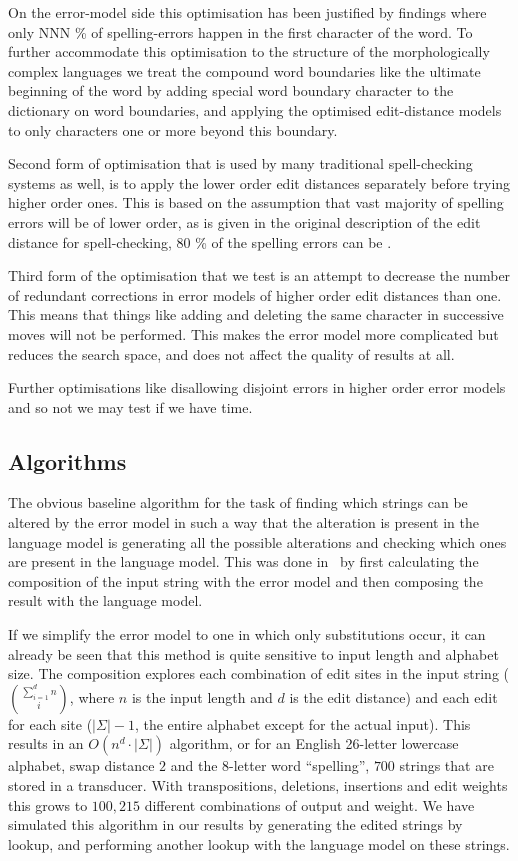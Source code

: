 \documentclass[11pt]{article}
\begin{document}
On the error-model side this optimisation has been
justified by findings where only NNN \% of spelling-errors happen in the first
character of the word\cite{Yannakoudakis/1983}. To further accommodate this
optimisation to the structure of the morphologically complex languages we treat
the compound word boundaries like the ultimate beginning of the word by adding
special word boundary character to the dictionary on word boundaries, and
applying the optimised edit-distance models to only characters one or more
beyond this boundary.

Second form of optimisation that is used by many traditional spell-checking
systems as well, is to apply the lower order edit distances separately before
trying higher order ones. This is based on the assumption that vast majority
of spelling errors will be of lower order, as is given in the original
description of the edit distance for spell-checking, 80 \% of the spelling
errors can be \cite{Pollock/1984}.

Third form of the optimisation that we test is an attempt to decrease the
number of redundant corrections in error models of higher order edit distances
than one. This means that things like  adding and deleting the
same character in successive moves will not be performed. This makes the error
model more complicated but reduces the search space, and does not affect the
quality of results at all.

Further optimisations like disallowing disjoint errors in higher order error
models and so not we may test if we have time.

\subsection{Algorithms}
\label{sec:algorithms}
The obvious baseline algorithm for the task of finding which strings can be
altered by the error model in such a way that the alteration is present in the
language model is generating all the possible alterations and checking which
ones are present in the language model. This was done in~\cite{hassan/2008}
by first calculating the composition of the input string with the error
model and then composing the result with the language model.

If we simplify the error model to one in which only substitutions occur,
it can already be seen that this method is quite sensitive to input length
and alphabet size. The composition explores each combination of edit sites
in the input string ($\sum_{i=1}^d n \choose i$, where $n$ is the input length
and $d$ is the edit distance) and each edit for each site ($|\Sigma| - 1$, the
entire alphabet except for the actual input). This results in an
$O(n^d \cdot |\Sigma|)$ algorithm, or for an English 26-letter lowercase
alphabet, swap distance $2$ and the $8$-letter word ``spelling'',
$700$ strings that are stored in a transducer. With transpositions, deletions,
insertions and edit weights this grows to $100,215$ different combinations of
output and weight. We have simulated this algorithm in our results by generating
the edited strings by lookup, and performing another lookup with the language
model on these strings.
\end{document}
